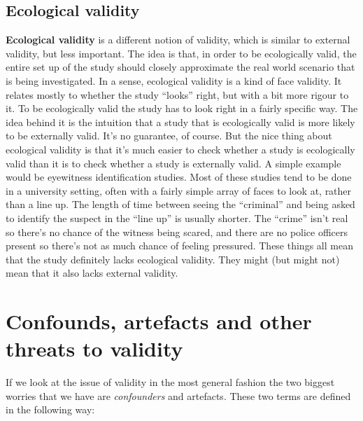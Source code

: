 \documentclass[
]{book}
\begin{document}
\hypertarget{ecological-validity}{%
\subsection{Ecological validity}\label{ecological-validity}}

\textbf{Ecological validity} is a different notion of validity, which is similar to external validity, but less important. The idea is that, in order to be ecologically valid, the entire set up of the study should closely approximate the real world scenario that is being investigated. In a sense, ecological validity is a kind of face validity. It relates mostly to whether the study ``looks'' right, but with a bit more rigour to it. To be ecologically valid the study has to look right in a fairly specific way. The idea behind it is the intuition that a study that is ecologically valid is more likely to be externally valid. It's no guarantee, of course. But the nice thing about ecological validity is that it's much easier to check whether a study is ecologically valid than it is to check whether a study is externally valid. A simple example would be eyewitness identification studies. Most of these studies tend to be done in a university setting, often with a fairly simple array of faces to look at, rather than a line up. The length of time between seeing the ``criminal'' and being asked to identify the suspect in the ``line up'' is usually shorter. The ``crime'' isn't real so there's no chance of the witness being scared, and there are no police officers present so there's not as much chance of feeling pressured. These things all mean that the study definitely lacks ecological validity. They might (but might not) mean that it also lacks external validity.

\hypertarget{confounds-artefacts-and-other-threats-to-validity}{%
\section{Confounds, artefacts and other threats to validity}\label{confounds-artefacts-and-other-threats-to-validity}}

If we look at the issue of validity in the most general fashion the two biggest worries that we have are \emph{confounders} and artefacts. These two terms are defined in the following way:
\end{document}
